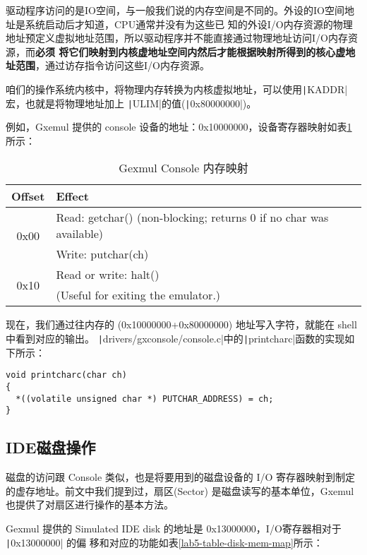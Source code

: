 驱动程序访问的是IO空间，与一般我们说的内存空间是不同的。外设的IO空间地址是系统启动后才知道，CPU通常并没有为这些已
知的外设I/O内存资源的物理地址预定义虚拟地址范围，所以驱动程序并不能直接通过物理地址访问I/O内存资源，而\textbf{必须
将它们映射到内核虚地址空间内然后才能根据映射所得到的核心虚地址范围}，通过访存指令访问这些I/O内存资源。

咱们的操作系统内核中，将物理内存转换为内核虚拟地址，可以使用\texttt|KADDR|宏，也就是将物理地址加上
\texttt|ULIM|的值(\texttt|0x80000000|)。

例如，Gxemul 提供的 console 设备的地址：0x10000000，设备寄存器映射如表\ref{lab5-table-console-mem-map}所示：

\begin{table}[htbp]
\caption{Gexmul Console 内存映射}\label{lab5-table-console-mem-map}
\centering
\begin{tabular}{|c|l|}
  \hline
    Offset & Effect \\
  \hline
  \multirow{2}{*}{0x00} & Read: getchar() (non-blocking; returns 0 if no char was available) \\
  \cline{2-2}
    & Write: putchar(ch) \\
  \hline
    \multirow{2}{*}{0x10} & Read or write: halt() \\
  \cline{2-2}
    & (Useful for exiting the emulator.) \\
  \hline
\end{tabular}
\end{table}

现在，我们通过往内存的 (0x10000000+0x80000000) 地址写入字符，就能在 shell 中看到对应的输出。
\texttt|drivers/gxconsole/console.c|中的\texttt|printcharc|函数的实现如下所示：

\begin{verbatim}
void printcharc(char ch)
{
  *((volatile unsigned char *) PUTCHAR_ADDRESS) = ch;
}
\end{verbatim}

\subsection{IDE磁盘操作}

磁盘的访问跟 Console 类似，也是将要用到的磁盘设备的 I/O 寄存器映射到制定的虚存地址。前文中我们提到过，扇区(Sector)
是磁盘读写的基本单位，Gxemul 也提供了对扇区进行操作的基本方法。

Gexmul 提供的 Simulated IDE disk 的地址是 0x13000000，I/O寄存器相对于 \texttt|0x13000000| 的偏
移和对应的功能如表\ref{lab5-table-disk-mem-map}所示：

